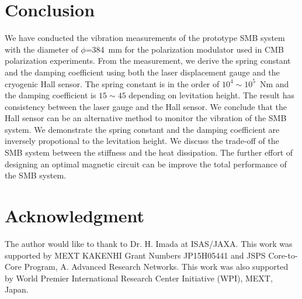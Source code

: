 \documentclass[a4paper]{jpconf}
\begin{document}
\section*{Conclusion}
We have conducted the vibration measurements of the prototype SMB system with the diameter of $\phi$=384~mm for the polarization modulator used in CMB polarization experiments.
From the measurement, we derive the spring constant and the damping coefficient using both the laser displacement gauge and the cryogenic Hall sensor.
The spring constant is in the order of $10^{4} \sim 10^{5}$~Nm and the damping coefficient is $15\sim45$ depending on levitation height.
The result has consistency between the laser gauge and the Hall sensor.
We conclude that the Hall sensor can be an alternative method to monitor the vibration of the SMB system.
We demonstrate the spring constant and the damping coefficient are inversely propotional to the levitation height.
We discuss the trade-off of the SMB system between the stiffness and the heat dissipation.
The further effort of designing an optimal magnetic circuit can be improve the total performance of the SMB system.

\section*{Acknowledgment}
The author would like to thank to Dr. H. Imada at ISAS/JAXA.
This work was supported by MEXT KAKENHI Grant Numbers JP15H05441 and JSPS Core-to-Core Program, A. Advanced Research Networks.
This work was also supported by World Premier International Research Center Initiative (WPI), MEXT, Japan.
\end{document}
